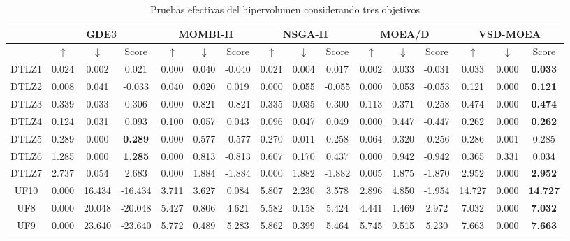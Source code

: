 \begin{table}[H]
\centering
\caption{Pruebas efectivas del hipervolumen considerando tres objetivos}
\label{tab:Effective_Test_3obj_exp}
\resizebox{\textwidth}{!}
{%
\begin{tabular}{|c|c|c|c|c|c|c|c|c|c|c|c|c|c|c|c|}
\hline
 & \multicolumn{3}{c|}{GDE3} & \multicolumn{3}{c|}{MOMBI-II} & \multicolumn{3}{c|}{NSGA-II} & \multicolumn{3}{c|}{MOEA/D} & \multicolumn{3}{c|}{VSD-MOEA} \\ \hline
 & $\uparrow$ & $\downarrow$ & Score & $\uparrow$ & $\downarrow$ & Score & $\uparrow$ & $\downarrow$ & Score & $\uparrow$ & $\downarrow$ & Score & $\uparrow$ & $\downarrow$ & Score \\ \hline
DTLZ1 & 0.024 & 0.002 & 0.021 & 0.000 & 0.040 & -0.040 & 0.021 & 0.004 & 0.017 & 0.002 & 0.033 & -0.031 & 0.033 & 0.000 & \textbf{0.033} \\ \hline
DTLZ2 & 0.008 & 0.041 & -0.033 & 0.040 & 0.020 & 0.019 & 0.000 & 0.055 & -0.055 & 0.000 & 0.053 & -0.053 & 0.121 & 0.000 & \textbf{0.121} \\ \hline
DTLZ3 & 0.339 & 0.033 & 0.306 & 0.000 & 0.821 & -0.821 & 0.335 & 0.035 & 0.300 & 0.113 & 0.371 & -0.258 & 0.474 & 0.000 & \textbf{0.474} \\ \hline
DTLZ4 & 0.124 & 0.031 & 0.093 & 0.100 & 0.057 & 0.043 & 0.096 & 0.047 & 0.049 & 0.000 & 0.447 & -0.447 & 0.262 & 0.000 & \textbf{0.262} \\ \hline
DTLZ5 & 0.289 & 0.000 & \textbf{0.289} & 0.000 & 0.577 & -0.577 & 0.270 & 0.011 & 0.258 & 0.064 & 0.320 & -0.256 & 0.286 & 0.001 & 0.285 \\ \hline
DTLZ6 & 1.285 & 0.000 & \textbf{1.285} & 0.000 & 0.813 & -0.813 & 0.607 & 0.170 & 0.437 & 0.000 & 0.942 & -0.942 & 0.365 & 0.331 & 0.034 \\ \hline
DTLZ7 & 2.737 & 0.054 & 2.683 & 0.000 & 1.884 & -1.884 & 0.000 & 1.882 & -1.882 & 0.005 & 1.875 & -1.870 & 2.952 & 0.000 & \textbf{2.952} \\ \hline
UF10 & 0.000 & 16.434 & -16.434 & 3.711 & 3.627 & 0.084 & 5.807 & 2.230 & 3.578 & 2.896 & 4.850 & -1.954 & 14.727 & 0.000 & \textbf{14.727} \\ \hline
UF8 & 0.000 & 20.048 & -20.048 & 5.427 & 0.806 & 4.621 & 5.582 & 0.158 & 5.424 & 4.441 & 1.469 & 2.972 & 7.032 & 0.000 & \textbf{7.032} \\ \hline
UF9 & 0.000 & 23.640 & -23.640 & 5.772 & 0.489 & 5.283 & 5.862 & 0.399 & 5.464 & 5.745 & 0.515 & 5.230 & 7.663 & 0.000 & \textbf{7.663} \\ \hline

\end{tabular}}
\end{table}
